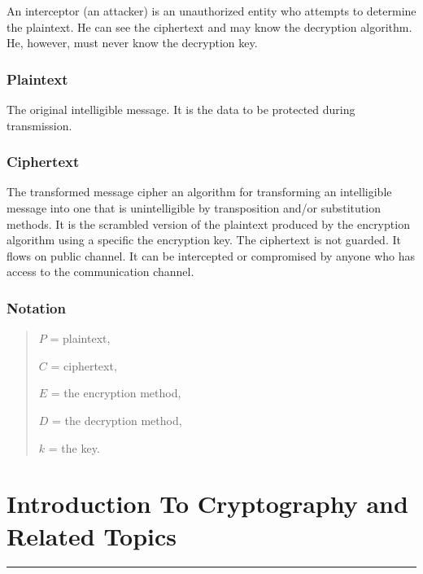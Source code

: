 \documentclass[british]{article}
\begin{document}
An interceptor (an attacker) is an unauthorized entity who attempts
to determine the plaintext. He can see the ciphertext and may know
the decryption algorithm. He, however, must never know the decryption
key.

\subsubsection{Plaintext}

The original intelligible message. It is the data to be protected
during transmission.

\subsubsection{Ciphertext}

The transformed message cipher an algorithm for transforming an intelligible
message into one that is unintelligible by transposition and/or substitution
methods. It is the scrambled version of the plaintext produced by
the encryption algorithm using a specific the encryption key. The
ciphertext is not guarded. It flows on public channel. It can be intercepted
or compromised by anyone who has access to the communication channel.
\begin{center}
\noindent{}
\par\end{center}

\subsubsection{Notation}
\begin{verse}
$P$ = plaintext,

$C$ = ciphertext,

$E$ = the encryption method,

$D$ = the decryption method,

$k$ = the key.
\end{verse}
\pagebreak{}

\section{Introduction To Cryptography and Related Topics}
\begin{center}
\rule[0.5ex]{450bp}{0.75pt}
\par\end{center}
\end{document}
